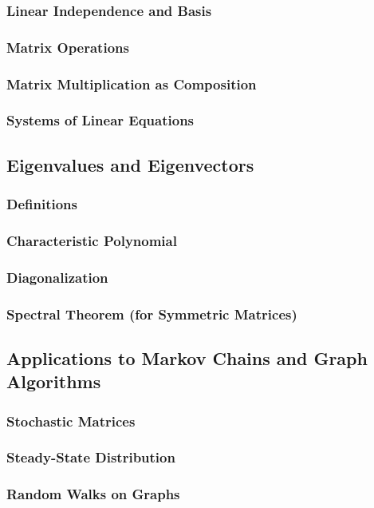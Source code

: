 \subsubsection{Linear Independence and Basis}
\subsubsection{Matrix Operations}
\subsubsection{Matrix Multiplication as Composition}
\subsubsection{Systems of Linear Equations}

\subsection{Eigenvalues and Eigenvectors}
\subsubsection{Definitions}
\subsubsection{Characteristic Polynomial}
\subsubsection{Diagonalization}
\subsubsection{Spectral Theorem (for Symmetric Matrices)}

\subsection{Applications to Markov Chains and Graph Algorithms}
\subsubsection{Stochastic Matrices}
\subsubsection{Steady-State Distribution}
\subsubsection{Random Walks on Graphs}

